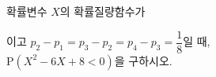 확률변수 $X$의 확률질량함수가 \par\smallskip{}\par\smallskip\noindent 이고 $p_2-p_1=p_3-p_2=p_4-p_3=\dfrac{1}{8}$일 때,\\ $\mathrm{P}(X^2-6X+8<0)$을 구하시오.
